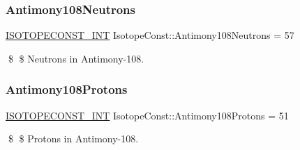 \subsubsection{\texorpdfstring{Antimony108\+Neutrons}{Antimony108Neutrons}}
{\footnotesize\ttfamily \mbox{\hyperlink{group___isotope_const-_macros_ga5f18360b3e99483a35c32d789e62621c}{I\+S\+O\+T\+O\+P\+E\+C\+O\+N\+S\+T\+\_\+\+I\+NT}} Isotope\+Const\+::\+Antimony108\+Neutrons = 57}

\$ \$ Neutrons in Antimony-\/108. \mbox{\label{group___isotope_const-_antimony-_sb108_gafe49be5a39f40a00cba0a8fe7591a74c}} 
\subsubsection{\texorpdfstring{Antimony108\+Protons}{Antimony108Protons}}
{\footnotesize\ttfamily \mbox{\hyperlink{group___isotope_const-_macros_ga5f18360b3e99483a35c32d789e62621c}{I\+S\+O\+T\+O\+P\+E\+C\+O\+N\+S\+T\+\_\+\+I\+NT}} Isotope\+Const\+::\+Antimony108\+Protons = 51}

\$ \$ Protons in Antimony-\/108. 